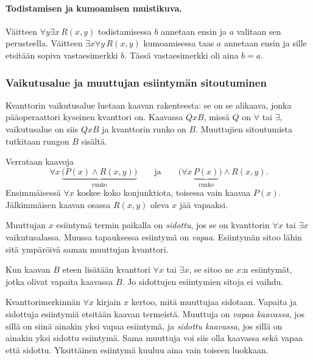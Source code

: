 \documentclass[11pt,a4paper]{amsart}
\begin{document}
\paragraph{Todistamisen ja kumoamisen muistikuva.}
Väitteen $\forall y\exists x\,R(x,y)$ todistamisessa $b$ annetaan
ensin ja $a$ valitaan sen perusteella. Väitteen
$\exists x\forall y\,R(x,y)$ kumoamisessa taas $a$ annetaan ensin
ja sille etsitään sopiva vastaesimerkki $b$. Tässä vastaesimerkki
oli aina $b=a$.

\clearpage
\subsubsection{Vaikutusalue ja muuttujan esiintymän sitoutuminen}

Kvanttorin vaikutusalue luetaan kaavan rakenteesta: se on se alikaava,
jonka pääoperaattori kyseinen kvanttori on. Kaavassa $QxB$,
missä $Q$ on $\forall$ tai $\exists$, vaikutusalue on siis $QxB$
ja kvanttorin runko on $B$. Muuttujien sitoutumista tutkitaan
rungon $B$ sisältä.

\begin{example}
  Verrataan kaavoja
  \[
    \forall x\,\underbrace{\bigl(P(x)\land R(x,y)\bigr)}_{\text{runko}}
    \qquad\text{ja}\qquad
    \bigl(\forall x\,\underbrace{P(x)}_{\text{runko}}\bigr)\land R(x,y).
  \]
  Ensimmäisessä $\forall x$ koskee koko konjunktiota, toisessa vain
  kaavaa $P(x)$. Jälkimmäisen kaavan osassa $R(x,y)$ oleva $x$
  jää vapaaksi.
\end{example}

\begin{definition}
  Muuttujan $x$ esiintymä termin paikalla on \emph{sidottu}, jos se
  on kvanttorin $\forall x$ tai $\exists x$ vaikutusalassa.
  Muussa tapauksessa esiintymä on \emph{vapaa}.
  Esiintymän sitoo lähin sitä ympäröivä saman muuttujan kvanttori.

  Kun kaavan $B$ eteen lisätään kvanttori $\forall x$ tai $\exists x$,
  se sitoo ne $x$:n esiintymät, jotka olivat vapaita kaavassa $B$.
  Jo sidottujen esiintymien sitoja ei vaihdu.
\end{definition}

Kvanttorimerkinnän $\forall x$ kirjain $x$ kertoo, mitä muuttujaa
sidotaan. Vapaita ja sidottuja esiintymiä etsitään kaavan termeistä.
Muuttuja on \emph{vapaa kaavassa}, jos sillä on siinä ainakin yksi
vapaa esiintymä, ja \emph{sidottu kaavassa}, jos sillä on ainakin yksi
sidottu esiintymä. Sama muuttuja voi siis olla kaavassa sekä vapaa
että sidottu. Yksittäinen esiintymä kuuluu aina vain toiseen luokkaan.
\end{document}
